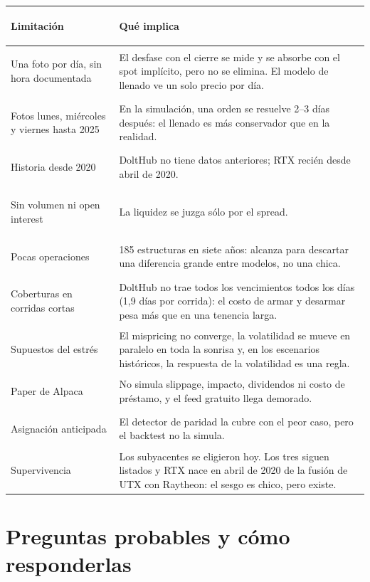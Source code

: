 \documentclass[11pt,a4paper]{article}
\begin{document}
\begin{center}
\small
\renewcommand{\arraystretch}{1.25}
\begin{tabularx}{\linewidth}{@{}>{\sffamily\bfseries\raggedright\arraybackslash}p{4.1cm}X@{}}
\toprule
Limitación & Qué implica \\
\midrule
Una foto por día, sin hora documentada & El desfase con el cierre se mide y se absorbe con el spot implícito, pero no se elimina. El modelo de llenado ve un solo precio por día. \\
Fotos lunes, miércoles y viernes hasta 2025 & En la simulación, una orden se resuelve 2–3 días después: el llenado es más conservador que en la realidad. \\
Historia desde 2020 & DoltHub no tiene datos anteriores; RTX recién desde abril de 2020. \\
Sin volumen ni open interest & La liquidez se juzga sólo por el spread. \\
Pocas operaciones & 185 estructuras en siete años: alcanza para descartar una diferencia grande entre modelos, no una chica. \\
Coberturas en corridas cortas & DoltHub no trae todos los vencimientos todos los días (1,9 días por corrida): el costo de armar y desarmar pesa más que en una tenencia larga. \\
Supuestos del estrés & El mispricing no converge, la volatilidad se mueve en paralelo en toda la sonrisa y, en los escenarios históricos, la respuesta de la volatilidad es una regla. \\
Paper de Alpaca & No simula slippage, impacto, dividendos ni costo de préstamo, y el feed gratuito llega demorado. \\
Asignación anticipada & El detector de paridad la cubre con el peor caso, pero el backtest no la simula. \\
Supervivencia & Los subyacentes se eligieron hoy. Los tres siguen listados y RTX nace en abril de 2020 de la fusión de UTX con Raytheon: el sesgo es chico, pero existe. \\
\bottomrule
\end{tabularx}
\end{center}

\section{Preguntas probables y cómo responderlas}
\end{document}

